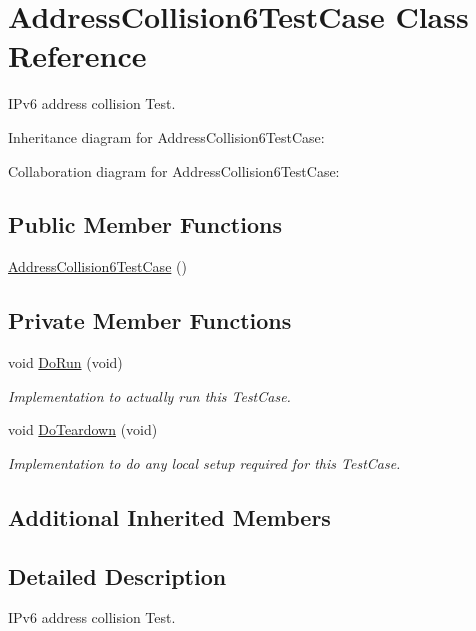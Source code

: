 \hypertarget{classAddressCollision6TestCase}{}\section{Address\+Collision6\+Test\+Case Class Reference}
\label{classAddressCollision6TestCase}


I\+Pv6 address collision Test.  




Inheritance diagram for Address\+Collision6\+Test\+Case\+:


Collaboration diagram for Address\+Collision6\+Test\+Case\+:
\subsection*{Public Member Functions}
\begin{DoxyCompactItemize}
\item 
\hyperlink{classAddressCollision6TestCase_a9b860edc749224c93047321e096cb23e}{Address\+Collision6\+Test\+Case} ()
\end{DoxyCompactItemize}
\subsection*{Private Member Functions}
\begin{DoxyCompactItemize}
\item 
void \hyperlink{classAddressCollision6TestCase_ac3d3bcc884983d0074804352b2a8e91b}{Do\+Run} (void)
\begin{DoxyCompactList}\small\item\em Implementation to actually run this Test\+Case. \end{DoxyCompactList}\item 
void \hyperlink{classAddressCollision6TestCase_af55535f050c2c9fb1e3c1ec1fcf73d4a}{Do\+Teardown} (void)
\begin{DoxyCompactList}\small\item\em Implementation to do any local setup required for this Test\+Case. \end{DoxyCompactList}\end{DoxyCompactItemize}
\subsection*{Additional Inherited Members}


\subsection{Detailed Description}
I\+Pv6 address collision Test. 

